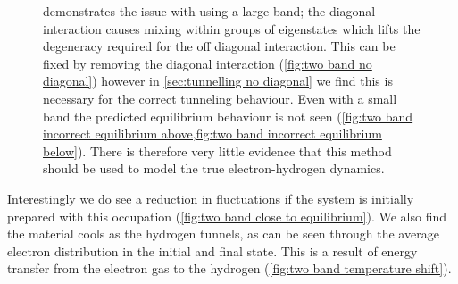 \begin{figure}[htbp]
{        demonstrates the issue with
        using a large band; the diagonal
        interaction causes mixing within
        groups of eigenstates which
        lifts the degeneracy required for
        the off diagonal interaction.
        This can be fixed by removing
        the diagonal interaction
        (\cref{fig:two band no diagonal})
        however in
        \cref{sec:tunnelling no diagonal}
        we find this is
        necessary for the correct
        tunneling behaviour.
        Even with a small band
        the
        predicted equilibrium
        behaviour is not seen
        (\cref{fig:two band incorrect equilibrium above,fig:two band incorrect equilibrium below}).
        There is therefore very
        little evidence that
        this method
        should be used to model
        the true
        electron-hydrogen dynamics.
    }\label{fig:issue with two band approach}
\end{figure}
Interestingly we do see a reduction in
fluctuations if the system is initially
prepared with this occupation
(\cref{fig:two band close to equilibrium}).
We also find the material cools
as the hydrogen tunnels, as can be seen
through the average electron distribution in
the initial and final state. This is a
result of energy transfer from the
electron gas to the hydrogen
(\cref{fig:two band temperature shift}).

